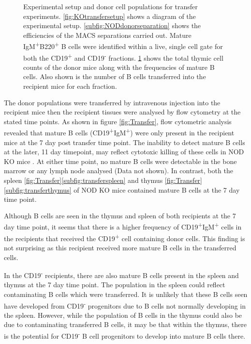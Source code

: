 \begin{figure}
\begin{subfigure}{0.5\textwidth}
	\label{subfig:WTdonortable}
	\end{subfigure}
\caption[Experimental setup and donor cell populations for transfer experiments]{Experimental setup and donor cell populations for transfer experiments.
\ref{fig:KOtransfersetup} shows a diagram of the experimental setup.
\ref{subfig:NODdonorseparation} shows the efficiencies of the MACS separations carried out. Mature IgM\textsuperscript{+}B220\textsuperscript{+} B cells were identified within a live, single cell gate for both the CD19\textsuperscript{+} and CD19\textsuperscript{-} fractions.
\ref{subfig:WTdonortable} shows the total thymic cell counts of the donor mice along with the frequencies of mature B cells. Also shown is the number of B cells transferred into the recipient mice for each fraction.}
\label{fig:Transfersetup}
\end{figure}
	
	
The donor populations were transferred by intravenous injection into the recipient mice then the recipient tissues were analysed by flow cytometry at the stated time points.
As shown in figure \cref{fig:Transfer}, flow cytometric analysis revealed that mature B cells (CD19\textsuperscript{+}IgM\textsuperscript{+}) were only present in the recipient mice at the 7 day post transfer time point.
The inability to detect mature B cells at the later, 11 day timepoint, may reflect cytotoxic killing of these cells in NOD KO mice \citep{Serreze1998}.
At either time point, no mature B cells were detectable in the bone marrow or any lymph node analysed (Data not shown).
In contrast, both the spleen \cref{fig:Transfer}\ref{subfig:transferspleen} and thymus \cref{fig:Transfer}\ref{subfig:transferthymus} of NOD KO mice contained mature B cells at the 7 day time point.


Although B cells are seen in the thymus and spleen of both recipients at the 7 day time point, it seems that there is a higher frequency of CD19\textsuperscript{+}IgM\textsuperscript{+} cells in the recipients that received the CD19\textsuperscript{+} cell containing donor cells.
This finding is not surprising as this recipient received more mature B cells in the transferred cells.

In the CD19\textsuperscript{-} recipients, there are also mature B cells present in the spleen and thymus at the 7 day time point.
The population in the spleen could reflect contaminating B cells which were transferred. 
It is unlikely that these B cells seen have developed from CD19\textsuperscript{-} progenitors due to B cells not normally developing in the spleen.
However, while the population of B cells in the thymus could also be due to contaminating transferred B cells, it may be that within the thymus, there is the potential for CD19\textsuperscript{-} B cell progenitors to develop into mature B cells there.



